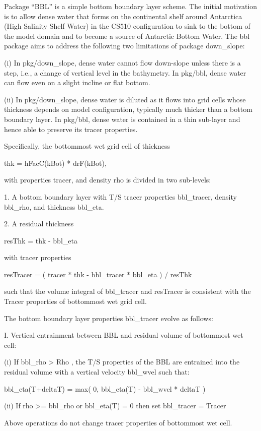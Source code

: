 
Package ``BBL'' is a simple bottom boundary layer scheme.  The initial
motivation is to allow dense water that forms on the continental shelf around
Antarctica (High Salinity Shelf Water) in the CS510 configuration to sink to
the bottom of the model domain and to become a source of Antarctic Bottom
Water.  The bbl package aims to address the following two limitations of
package down_slope:

(i) In pkg/down_slope, dense water cannot flow down-slope unless there is a
step, i.e., a change of vertical level in the bathymetry.  In pkg/bbl, dense
water can flow even on a slight incline or flat bottom.

(ii) In pkg/down_slope, dense water is diluted as it flows into grid cells
whose thickness depends on model configuration, typically much thicker than a
bottom boundary layer.  In pkg/bbl, dense water is contained in a thin
sub-layer and hence able to preserve its tracer properties.

Specifically, the bottommost wet grid cell of thickness

    thk = hFacC(kBot) * drF(kBot),

with properties tracer, and density rho is divided in two sub-levels:

1. A bottom boundary layer with T/S tracer properties bbl_tracer,
density bbl_rho, and thickness bbl_eta.

2. A residual thickness

    resThk = thk - bbl_eta

with tracer properties

    resTracer = ( tracer * thk - bbl_tracer * bbl_eta ) / resThk

such that the volume integral of bbl_tracer and resTracer is consistent with
the Tracer properties of bottommost wet grid cell.

The bottom boundary layer properties bbl_tracer evolve as follows:

I. Vertical entrainment between BBL and residual volume of bottommost wet cell:

(i) If bbl_rho > Rho , the T/S properties of the BBL are entrained into
the residual volume with a vertical velocity bbl_wvel such that:

    bbl_eta(T+deltaT) = max( 0, bbl_eta(T) - bbl_wvel * deltaT )

(ii) If rho >= bbl_rho or bbl_eta(T) = 0 then set bbl_tracer = Tracer

Above operations do not change tracer properties of bottommost wet cell.

